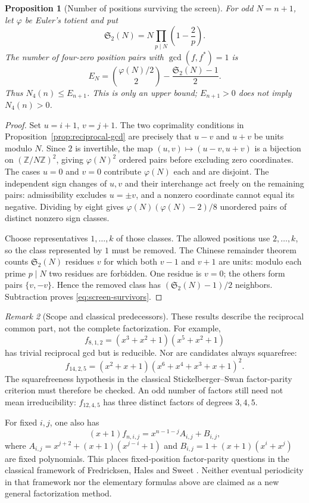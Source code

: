 \documentclass[11pt]{article}
\newtheorem{proposition}{Proposition}[section]
\theoremstyle{definition}
\theoremstyle{remark}
\newtheorem{remark}[proposition]{Remark}
\begin{document}
\begin{proposition}[Number of positions surviving the screen]
\label{prop:reciprocal-survivors}
For odd \(N=n+1\), let \(\varphi\) be Euler's totient and put
\[
 \mathfrak S_2(N)=N\prod_{p\mid N}\left(1-\frac2p\right).
\]
The number of four-zero position pairs with \(\gcd(f,f^*)=1\) is
\begin{equation}\label{eq:screen-survivors}
 E_N=\binom{\varphi(N)/2}{2}-\frac{\mathfrak S_2(N)-1}{2}.
\end{equation}
Thus \(N_4(n)\le E_{n+1}\). This is only an upper bound;
\(E_{n+1}>0\) does not imply \(N_4(n)>0\).
\end{proposition}
\begin{proof}
Set \(u=i+1\), \(v=j+1\). The two coprimality conditions in
Proposition~\ref{prop:reciprocal-gcd} are precisely that \(u-v\)
and \(u+v\) be units modulo \(N\). Since \(2\) is invertible,
the map \((u,v)\mapsto(u-v,u+v)\) is a bijection on
\((\mathbb Z/N\mathbb Z)^2\), giving \(\varphi(N)^2\) ordered
pairs before excluding zero coordinates. The cases \(u=0\) and
\(v=0\) contribute \(\varphi(N)\) each and are disjoint.
The independent sign changes of \(u,v\) and their interchange
act freely on the remaining pairs: admissibility excludes
\(u=\pm v\), and a nonzero coordinate cannot equal its negative.
Dividing by eight gives
\(\varphi(N)(\varphi(N)-2)/8\) unordered pairs of distinct
nonzero sign classes.

Choose representatives \(1,\ldots,k\) of those classes. The
allowed positions use \(2,\ldots,k\), so the class represented
by \(1\) must be removed. The Chinese remainder theorem counts
\(\mathfrak S_2(N)\) residues \(v\) for which both \(v-1\) and
\(v+1\) are units: modulo each prime \(p\mid N\) two residues
are forbidden. One residue is \(v=0\); the others form pairs
\(\{v,-v\}\). Hence the removed class has
\((\mathfrak S_2(N)-1)/2\) neighbors. Subtraction proves
\eqref{eq:screen-survivors}.
\end{proof}

\begin{remark}[Scope and classical predecessors]
\label{rem:screen-scope}
These results describe the reciprocal common part, not the complete
factorization. For example,
\[
 f_{8,1,2}=(x^3+x^2+1)(x^5+x^2+1)
\]
has trivial reciprocal gcd but is reducible. Nor are candidates
always squarefree:
\[
 f_{14,2,5}=(x^2+x+1)(x^6+x^4+x^3+x+1)^2.
\]
The squarefreeness hypothesis in the classical
Stickelberger--Swan factor-parity criterion \cite{Swan62} must
therefore be checked. An odd number of factors still need not mean
irreducibility: \(f_{12,4,5}\) has three distinct factors of degrees
\(3,4,5\).

For fixed \(i,j\), one also has
\[
 (x+1)f_{n,i,j}=x^{n-1-j}A_{i,j}+B_{i,j},
\]
where \(A_{i,j}=x^{j+2}+(x+1)(x^{j-i}+1)\) and
\(B_{i,j}=1+(x+1)(x^i+x^j)\) are fixed polynomials.
This places fixed-position factor-parity questions in the
classical framework of Fredricksen, Hales and Sweet \cite{FHS86}.
Neither eventual periodicity in that framework nor the elementary
formulas above are claimed as a new general factorization method.
\end{remark}
\end{document}
